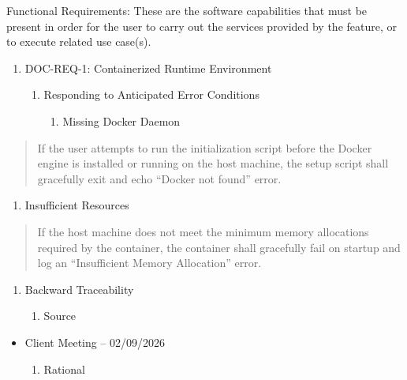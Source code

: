 \documentclass[
]{article}
\begin{document}
Functional Requirements: These are the software capabilities that must
be present in order for the user to carry out the services provided by
the feature, or to execute related use case(s).

\begin{enumerate}
\def\labelenumi{\Roman{enumi})}
\item
  DOC-REQ-1: Containerized Runtime Environment

  \begin{enumerate}
  \def\labelenumii{\alph{enumii}.}
  \item
    Responding to Anticipated Error Conditions

    \begin{enumerate}
    \def\labelenumiii{\roman{enumiii}.}
    \item
      Missing Docker Daemon
    \end{enumerate}
  \end{enumerate}
\end{enumerate}

\begin{quote}
If the user attempts to run the initialization script before the Docker
engine is installed or running on the host machine, the setup script
shall gracefully exit and echo ``Docker not found'' error.
\end{quote}

\begin{enumerate}
\def\labelenumi{\roman{enumi}.}
\setcounter{enumi}{1}
\item
  Insufficient Resources
\end{enumerate}

\begin{quote}
If the host machine does not meet the minimum memory allocations
required by the container, the container shall gracefully fail on
startup and log an ``Insufficient Memory Allocation'' error.
\end{quote}

\begin{enumerate}
\def\labelenumi{\alph{enumi}.}
\setcounter{enumi}{1}
\item
  Backward Traceability

  \begin{enumerate}
  \def\labelenumii{\roman{enumii}.}
  \item
    Source
  \end{enumerate}
\end{enumerate}

\begin{itemize}
\item
  Client Meeting -- 02/09/2026

  \begin{enumerate}
  \def\labelenumi{\roman{enumi}.}
  \item
    Rational
  \end{enumerate}
\end{itemize}
\end{document}
